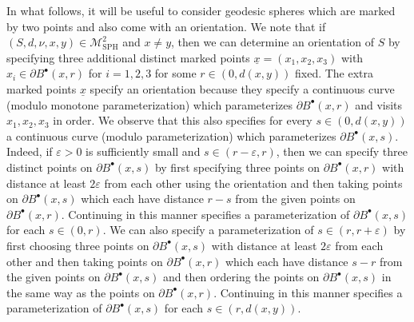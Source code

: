 \documentclass[JEP,XML,SOM,Unicode]{cedram}
\let\mathcal\mathscr
\newcommand{\sbullet}{{\scriptscriptstyle\bullet}}
\let\epsilon\varepsilon
\theoremstyle{plain}
\numberwithin{theorem}{section}
\theoremstyle{definition}
\newcommand\gmsspace{{\mathcal M}_{\mathrm{SPH}}}
\let\ul\underline
\newcommand{\fb}[2]{B^\sbullet(#1,#2)}
\begin{document}
In what follows, it will be useful to consider geodesic spheres which are marked by two points and also come with an orientation. We note that if $(S,d,\nu,x,y) \in \gmsspace^2$ and $x \neq y$, then we can determine an orientation of $S$ by specifying three additional distinct marked points $\ul{x}=(x_1,x_2,x_3)$ with $x_i \in \partial \fb{x}{r}$ for $i=1,2,3$ for some $r \in (0,d(x,y))$ fixed. The extra marked points $\ul{x}$ specify an orientation because they specify a continuous curve (modulo monotone parameterization) which parameterizes $\partial \fb{x}{r}$ and visits $x_1,x_2,x_3$ in order. We observe that this also specifies for every $s \in (0,d(x,y))$ a continuous curve (modulo parameterization) which parameterizes $\partial \fb{x}{s}$. Indeed, if $\epsilon > 0$ is sufficiently small and $s \in (r-\epsilon,r)$, then we can specify three distinct points on $\partial \fb{x}{s}$ by first specifying three points on $\partial \fb{x}{r}$ with distance at least $2 \epsilon$ from each other using the orientation and then taking points on $\partial \fb{x}{s}$ which each have distance $r-s$ from the given points on $\partial \fb{x}{r}$. Continuing in this manner specifies a parameterization of $\partial \fb{x}{s}$ for each $s \in (0,r)$. We can also specify a parameterization of $s \in (r,r+\epsilon)$ by first choosing three points on $\partial \fb{x}{s}$ with distance at least $2\epsilon$ from each other and then taking points on $\partial \fb{x}{r}$ which each have distance $s-r$ from the given points on $\partial \fb{x}{s}$ and then ordering the points on $\partial \fb{x}{s}$ in the same way as the points on $\partial \fb{x}{r}$. Continuing in this manner specifies a parameterization of $\partial \fb{x}{s}$ for each $s \in (r,d(x,y))$.
\end{document}
